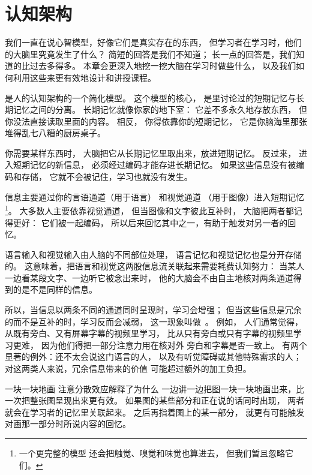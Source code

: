 \chapter{认知架构}\label{s:architecture}

我们一直在说心智模型，好像它们是真实存在的东西，
但学习者在学习时，他们的大脑里究竟发生了什么？
简短的回答是我们不知道；
长一点的回答是，我们知道的比过去多得多。
本章会更深入地挖一挖大脑在学习时做些什么，
以及我们如何利用这些来更有效地设计和讲授课程。



是人的认知架构的一个简化模型。
这个模型的核心，
是里讨论过的短期记忆与长期记忆之间的分离。
长期记忆就像你家的地下室：
它差不多永久地存放东西，
但你没法直接读取里面的内容。
相反，
你得依靠你的短期记忆，
它是你脑海里那张堆得乱七八糟的厨房桌子。

你需要某样东西时，
大脑把它从长期记忆里取出来，放进短期记忆。
反过来，
进入短期记忆的新信息，
必须经过编码才能存进长期记忆。
如果这些信息没有被编码和存储，
它就不会被记住，学习也就没有发生。

信息主要通过你的言语通道（用于语言）
和视觉通道
（用于图像）进入短期记忆\footnote{
  一个更完整的模型
  还会把触觉、嗅觉和味觉也算进去，
  但我们暂且忽略它们。}。
大多数人主要依靠视觉通道，
但当图像和文字彼此互补时，
大脑把两者都记得更好：
它们被一起编码，
所以后来回忆其中之一，有助于触发对另一者的回忆。

语言输入和视觉输入由人脑的不同部位处理，
语言记忆和视觉记忆也是分开存储的。
这意味着，把语言和视觉这两股信息流关联起来需要耗费认知努力：
当某人一边看某段文字、一边听它被念出来时，
他的大脑会不由自主地核对两条通道得到的是不是同样的信息。

所以，当信息以两条不同的通道同时呈现时，学习会增强；
但当这些信息是冗余的而不是互补的时，学习反而会减弱，
这一现象叫做~\cite{Maye2003}。
例如，
人们通常觉得，从既有旁白、又有屏幕字幕的视频里学习，
比从只有旁白或只有字幕的视频里学习更难，
因为他们得把一部分注意力用在核对外
旁白和字幕是否一致上。
有两个显著的例外：还不太会说这门语言的人，
以及有听觉障碍或其他特殊需求的人；
对这两类人来说，冗余信息带来的价值
可能超过额外的加工负担。

\begin{aside}{一块一块地画}
  注意分散效应解释了为什么
  一边讲一边把图一块一块地画出来，比一次把整张图呈现出来更有效。
  如果图的某些部分和正在说的话同时出现，
  两者就会在学习者的记忆里关联起来。
  之后再指着图上的某一部分，
  就更有可能触发对画那一部分时所说内容的回忆。
\end{aside}

